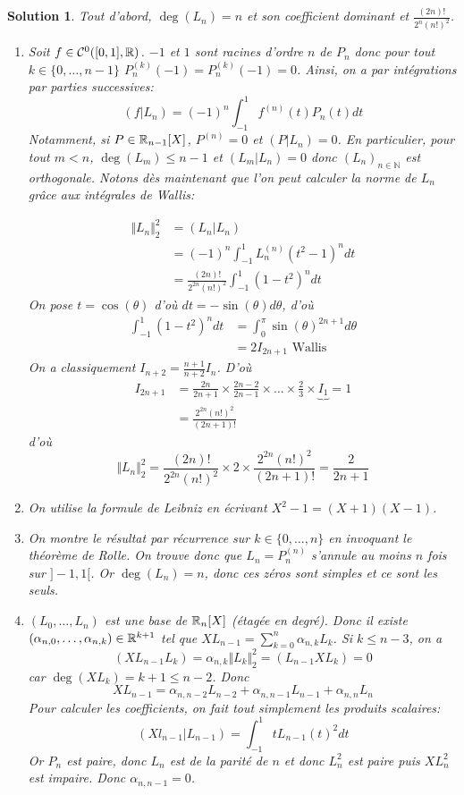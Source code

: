 \documentclass[12pt]{article}
\newtheorem{solution}{Solution}[section]
\theoremstyle{remark}
\newcommand{\N}{\mathbb{N}} \newcommand{\Z}{\mathbb{Z}}
\numberwithin{equation}{section}
\begin{document}
\begin{solution}
	Tout d'abord, $\deg(L_{n})=n$ et  son coefficient dominant et $\frac{(2n)!}{2^{n}(n!)^{2}}$.
	\begin{enumerate}
		\item Soit $f\in\mathcal{C}^{0}([0,1],\mathbb{R})$. $-1$ et $1$ sont racines d'ordre $n$ de $P_{n}$ donc pour tout $k\in\{0,\dots,n-1\}$ $P_{n}^{(k)}(-1)=P_{n}^{(k)}(-1)=0$. Ainsi, on a par intégrations par parties successives:
		$$(f|L_{n})=(-1)^{n}\int_{-1}^{1}f^{(n)}(t)P_{n}(t)dt$$
		Notamment, si $P\in\mathbb{R}_{n-1}[X]$, $P^{(n)}=0$ et $(P|L_{n})=0$. En particulier, pour tout $m<n$, $\deg(L_{m})\leqslant n-1$ et $(L_{m}|L_{n})=0$ donc $(L_{n})_{n\in\N}$ est orthogonale. Notons dès maintenant que l'on peut calculer la norme de $L_{n}$ grâce aux intégrales de Wallis:
		
		\begin{align*}
			\Vert L_{n}\Vert_{2}^{2}
			&=(L_{n}|L_{n})\\
			&=(-1)^{n}\int_{-1}^{1}L_{n}^{(n)}(t^{2}-1)^{n}dt\\
			&=\frac{(2n)!}{2^{2n}(n!)^{2}}\int_{-1}^{1}(1-t^{2})^{n}dt
		\end{align*}
		On pose $t=\cos(\theta)$ d'où $dt=-\sin(\theta)d\theta$, d'où
		\begin{align*}
			\int_{-1}^{1}(1-t^{2})^{n}dt
			&=\int_{0}^{\pi}\sin(\theta)^{2n+1}d\theta\\
			&=2I_{2n+1}\text{ Wallis }
		\end{align*}
		On a classiquement $I_{n+2}=\frac{n+1}{n+2}I_{n}$.
		D'où
		\begin{align*}
			I_{2n+1}
			&=\frac{2n}{2n+1}\times\frac{2n-2}{2n-1}\times\dots\times\frac{2}{3}\times \underbrace{I_{1}}{=1}\\
			&=\frac{2^{2n}(n!)^{2}}{(2n+1)!}
		\end{align*}
		d'où
		$$\Vert L_{n}\Vert_{2}^{2}=\frac{(2n)!}{2^{2n}(n!)^{2}}\times 2\times \frac{2^{2n}(n!)^{2}}{(2n+1)!}=\frac{2}{2n+1}$$

		\item On utilise la formule de Leibniz en écrivant $X^{2}-1=(X+1)(X-1)$.
		\item On montre le résultat par récurrence sur $k\in\{0,\dots,n\}$ en invoquant le théorème de Rolle. On trouve donc que $L_{n}=P_{n}^{(n)}$ s'annule au moins $n$ fois sur $]-1,1[$. Or $\deg(L_{n})=n$, donc ces zéros sont simples et ce sont les seuls.
		\item $(L_{0},\dots,L_{n})$ est une base de $\mathbb{R}_{n}[X]$ (étagée en degré). Donc il existe $(\alpha_{n,0},\dots,\alpha_{n,k})\in\mathbb{R}^{k+1}$ tel que $XL_{n-1}=\sum_{k=0}^{n}\alpha_{n,k}L_{k}$. Si $k\leqslant n-3$, on a
		$$(XL_{n-1} L_{k})=\alpha_{n,k}\Vert L_{k}\Vert_{2}^{2}=(L_{n-1}XL_{k})=0$$
		car $\deg(XL_{k})=k+1\leqslant n-2$. Donc 
		$$XL_{n-1}=\alpha_{n,n-2}L_{n-2}+\alpha_{n,n-1}L_{n-1}+\alpha_{n,n}L_{n}$$
		Pour calculer les coefficients, on fait tout simplement les produits scalaires:
		$$(Xl_{n-1}|L_{n-1})=\int_{-1}^{1}tL_{n-1}(t)^{2}dt$$
		Or $P_{n}$ est paire, donc $L_{n}$ est de la parité de $n$ et donc $L_{n}^{2}$ est paire puis $XL_{n}^{2}$ est impaire. Donc $\alpha_{n,n-1}=0$.


\end{enumerate}
\end{solution}
\end{document}
